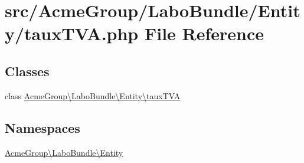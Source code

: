 \hypertarget{taux_t_v_a_8php}{\section{src/\+Acme\+Group/\+Labo\+Bundle/\+Entity/taux\+T\+V\+A.php File Reference}
\label{taux_t_v_a_8php}
}
\subsection*{Classes}
\begin{DoxyCompactItemize}
\item 
class \hyperlink{class_acme_group_1_1_labo_bundle_1_1_entity_1_1taux_t_v_a}{Acme\+Group\textbackslash{}\+Labo\+Bundle\textbackslash{}\+Entity\textbackslash{}taux\+T\+V\+A}
\end{DoxyCompactItemize}
\subsection*{Namespaces}
\begin{DoxyCompactItemize}
\item 
 \hyperlink{namespace_acme_group_1_1_labo_bundle_1_1_entity}{Acme\+Group\textbackslash{}\+Labo\+Bundle\textbackslash{}\+Entity}
\end{DoxyCompactItemize}
